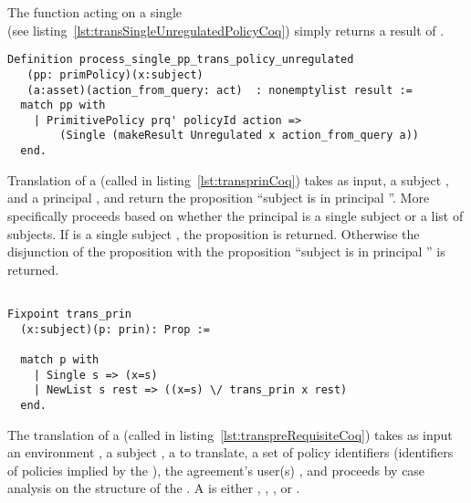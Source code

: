 The function  acting on a single \\  (see listing~\ref{lst:transSingleUnregulatedPolicyCoq}) simply returns a result of .



\begin{lstlisting}
Definition process_single_pp_trans_policy_unregulated
   (pp: primPolicy)(x:subject)
   (a:asset)(action_from_query: act)  : nonemptylist result :=
  match pp with
    | PrimitivePolicy prq' policyId action =>
        (Single (makeResult Unregulated x action_from_query a))
  end.
\end{lstlisting}




Translation of a  (called  in listing~\ref{lst:transprinCoq}) takes as input, a subject , and a principal , and return the proposition ``subject  is in principal ''. More specifically  proceeds based on whether the principal  is a single subject or a list of subjects. If  is a single subject , the proposition  is returned. Otherwise the disjunction of the proposition  with the proposition ``subject  is in principal '' is returned.

\begin{minipage}{\linewidth}
\begin{lstlisting}

Fixpoint trans_prin
  (x:subject)(p: prin): Prop :=

  match p with
    | Single s => (x=s)
    | NewList s rest => ((x=s) \/ trans_prin x rest)
  end.
\end{lstlisting}
\end{minipage}


The translation of a  (called  in listing~\ref{lst:transpreRequisiteCoq}) takes as input an environment , a subject , a   to translate, a set of policy identifiers  (identifiers of policies implied by the ), the agreement's user(s) , and proceeds by case analysis on the structure of the . A  is either , ,  , or . 

